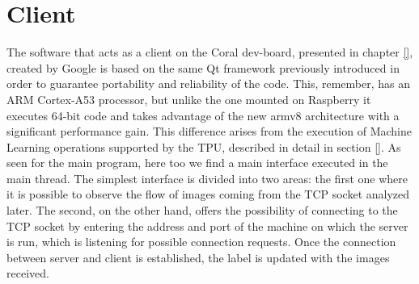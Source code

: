 %
\section{Client}
\label{sec:software-coral-intro}
The software that acts as a client on the Coral dev-board, presented in chapter
\ref{}, created by Google is based on the same Qt framework previously
introduced in order to guarantee portability and reliability of the code. This,
remember, has an ARM Cortex-A53 processor, but unlike the one mounted on
Raspberry it executes 64-bit code and takes advantage of the new armv8
architecture with a significant performance gain. This difference arises from
the execution of Machine Learning operations supported by the TPU, described in
detail in section \ref{}.
%
As seen for the main program, here too we find a main interface executed in the
main thread. The simplest interface is divided into two areas: the first one
where it is possible to observe the flow of images coming from the TCP socket
analyzed later. The second, on the other hand, offers the possibility of
connecting to the TCP socket by entering the address and port of the machine on
which the server is run, which is listening for possible connection requests.
Once the connection between server and client is established, the label is
updated with the images received.
%
